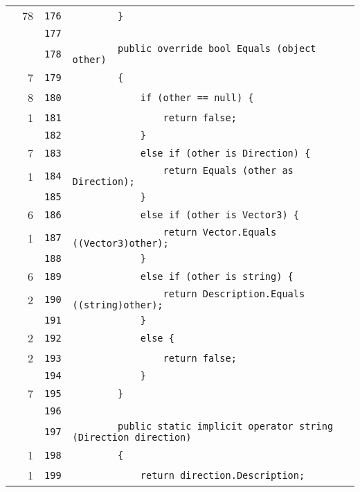 \documentclass[a4paper,10pt]{article}
\begin{document}
\begin{longtable}[l]{lrrl}
\cellcolor{green} & 78 & \verb~176~ & \verb~        }~\\
\cellcolor{gray} &  & \verb~177~ & \verb~~\\
\cellcolor{gray} &  & \verb~178~ & \verb~        public override bool Equals (object other)~\\
\cellcolor{green} & 7 & \verb~179~ & \verb~        {~\\
\cellcolor{green} & 8 & \verb~180~ & \verb~            if (other == null) {~\\
\cellcolor{green} & 1 & \verb~181~ & \verb~                return false;~\\
\cellcolor{gray} &  & \verb~182~ & \verb~            }~\\
\cellcolor{green} & 7 & \verb~183~ & \verb~            else if (other is Direction) {~\\
\cellcolor{green} & 1 & \verb~184~ & \verb~                return Equals (other as Direction);~\\
\cellcolor{gray} &  & \verb~185~ & \verb~            }~\\
\cellcolor{green} & 6 & \verb~186~ & \verb~            else if (other is Vector3) {~\\
\cellcolor{green} & 1 & \verb~187~ & \verb~                return Vector.Equals ((Vector3)other);~\\
\cellcolor{gray} &  & \verb~188~ & \verb~            }~\\
\cellcolor{green} & 6 & \verb~189~ & \verb~            else if (other is string) {~\\
\cellcolor{green} & 2 & \verb~190~ & \verb~                return Description.Equals ((string)other);~\\
\cellcolor{gray} &  & \verb~191~ & \verb~            }~\\
\cellcolor{green} & 2 & \verb~192~ & \verb~            else {~\\
\cellcolor{green} & 2 & \verb~193~ & \verb~                return false;~\\
\cellcolor{gray} &  & \verb~194~ & \verb~            }~\\
\cellcolor{green} & 7 & \verb~195~ & \verb~        }~\\
\cellcolor{gray} &  & \verb~196~ & \verb~~\\
\cellcolor{gray} &  & \verb~197~ & \verb~        public static implicit operator string (Direction direction)~\\
\cellcolor{green} & 1 & \verb~198~ & \verb~        {~\\
\cellcolor{green} & 1 & \verb~199~ & \verb~            return direction.Description;~\\

\end{longtable}
\end{document}
